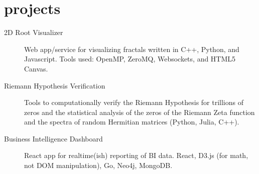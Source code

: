 \documentclass[11pt]{friggeri-cv}
\begin{document}
\section{projects}
\begin{description}
\item[2D Root Visualizer] Web app/service for visualizing fractals written in C++, Python, and Javascript. Tools used: OpenMP, ZeroMQ, Websockets, and HTML5 Canvas.
\item[Riemann Hypothesis Verification] Tools to computationally verify the Riemann Hypothesis for trillions of zeros and the statistical analysis of the zeros of the Riemann Zeta function and the spectra of random Hermitian matrices (Python, Julia, C++).
\item[Business Intelligence Dashboard] React app for realtime(ish) reporting of BI data. React, D3.js (for math, not DOM manipulation), Go, Neo4j, MongoDB.
\end{description}
\end{document}
